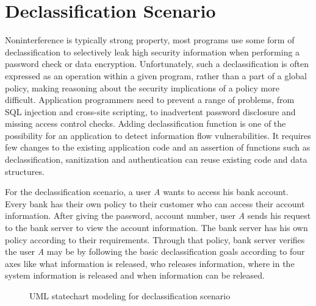 \section{Declassification Scenario}
Noninterference is typically strong property, most programs use some form of declassification to selectively leak high security information when performing a password check or data encryption. Unfortunately, such  a declassification is often expressed as an operation within a given  program, rather than a part of a global policy, making reasoning about the security implications of a policy more difficult. Application programmers need to prevent a range of problems, from SQL injection and cross-site scripting, to inadvertent password disclosure and missing access control checks. Adding declassification function is one of the possibility for an application to detect information flow vulnerabilities. It requires few changes to the existing application code and an assertion of functions such as declassification, sanitization and authentication can reuse existing code and data structures. 
 
For the declassification scenario, a user \emph{A} wants to access his bank account. Every bank has their own policy to their customer who can access their account information. After giving the password, account number, user \emph{A} sends his request to the bank server to view the account information. The bank server has his own policy according to their requirements. Through that policy, bank server verifies the user \emph{A} may be by following the basic declassification goals according to four axes like what information is released,
 who releases information, where in the system information is released and when information can be released. 
 
\begin{figure}[htbp]
	\centering
	\label{fig:declassification_scenario}
	\caption{UML statechart modeling for declassification scenario}
\end{figure} 
 
